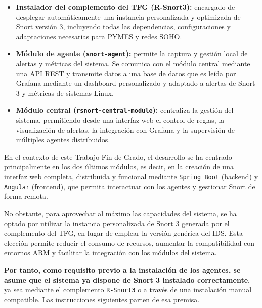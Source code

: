 \documentclass[11pt,a4paper,twoside]{report}
\begin{document}
\begin{itemize}
	\item \textbf{Instalador del complemento del TFG (R-Snort3):} encargado de desplegar automáticamente una instancia personalizada y optimizada de Snort versión 3, incluyendo todas las dependencias, configuraciones y adaptaciones necesarias para PYMES y redes SOHO.
	
	\item \textbf{Módulo de agente (\texttt{snort-agent}):} permite la captura y gestión local de alertas y métricas del sistema. Se comunica con el módulo central mediante una API REST y transmite datos a una base de datos que es leída por Grafana mediante un dashboard personalizado y adaptado a alertas de Snort 3 y métricas de sistemas Linux.
	
	\item \textbf{Módulo central (\texttt{rsnort-central-module}):} centraliza la gestión del sistema, permitiendo desde una interfaz web el control de reglas, la visualización de alertas, la integración con Grafana y la supervisión de múltiples agentes distribuidos.
\end{itemize}

En el contexto de este Trabajo Fin de Grado, el desarrollo se ha centrado principalmente en los dos últimos módulos, es decir, en la creación de una interfaz web completa, distribuida y funcional mediante \texttt{Spring Boot} (backend) y \texttt{Angular} (frontend), que permita interactuar con los agentes y gestionar Snort de forma remota.\newline

No obstante, para aprovechar al máximo las capacidades del sistema, se ha optado por utilizar la instancia personalizada de Snort 3 generada por el complemento del TFG, en lugar de emplear la versión genérica del IDS. Esta elección permite reducir el consumo de recursos, aumentar la compatibilidad con entornos ARM y facilitar la integración con los módulos del sistema.\newline

\textbf{Por tanto, como requisito previo a la instalación de los agentes, se asume que el sistema ya dispone de Snort 3 instalado correctamente}, ya sea mediante el complemento \texttt{R-Snort3} o a través de una instalación manual compatible. Las instrucciones siguientes parten de esa premisa.
\end{document}
